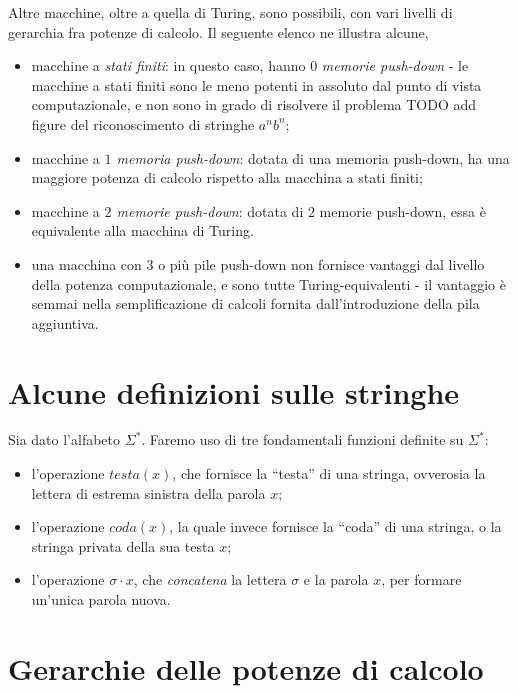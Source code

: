 \documentclass[10pt]{book}
\begin{document}
Altre macchine, oltre a quella di Turing, sono possibili, con vari livelli di
gerarchia fra potenze di calcolo. Il seguente elenco ne illustra alcune,

\begin{itemize}
    \item macchine a \emph{stati finiti}: in questo caso, hanno $0$
        \emph{memorie push-down} \-- le macchine a stati finiti sono le meno
        potenti in assoluto dal punto di vista computazionale, e non sono in
        grado di risolvere il problema TODO add figure del riconoscimento di
        stringhe $a^n b^n$;
    \item macchine a \emph{$1$ memoria push-down}: dotata di una memoria
        push-down, ha una maggiore potenza di calcolo rispetto alla macchina a
        stati finiti;
    \item macchine a \emph{$2$ memorie push-down}: dotata di $2$ memorie
        push-down, essa è equivalente alla macchina di Turing.
    \item una macchina con $3$ o più pile push-down non fornisce vantaggi dal
        livello della potenza computazionale, e sono tutte Turing-equivalenti
        \-- il vantaggio è semmai nella semplificazione di calcoli fornita
        dall'introduzione della pila aggiuntiva.
\end{itemize}


\section{Alcune definizioni sulle stringhe}

Sia dato l'alfabeto $\Sigma^*$. Faremo uso di tre fondamentali funzioni
definite su $\Sigma^*$:
\begin{itemize}
    \item l'operazione $testa(x)$, che fornisce la ``testa'' di una stringa,
        ovverosia la lettera di estrema sinistra della parola $x$;
    \item l'operazione $coda(x)$, la quale invece fornisce la ``coda'' di una
        stringa, o la stringa privata della sua testa $x$;
    \item l'operazione $\sigma \cdot x$, che \emph{concatena} la lettera
        $\sigma$ e la parola $x$, per formare un'unica parola nuova.
\end{itemize}


\section{Gerarchie delle potenze di calcolo}
\end{document}
